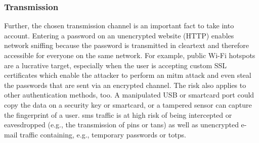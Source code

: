 \subsubsection{Transmission}

Further, the chosen transmission channel is an important fact to take into account. Entering a password on an unencrypted website (HTTP) enables network sniffing because the password is transmitted in cleartext and therefore accessible for everyone on the same network. For example, public Wi-Fi hotspots are a lucrative target, especially when the user is accepting custom SSL certificates which enable the attacker to perform an \gls{mitm} attack and even steal the passwords that are sent via an encrypted channel. The risk also applies to other authentication methods, too. A manipulated USB or smartcard port could copy the data on a security key or smartcard, or a tampered sensor can capture the fingerprint of a user. \gls{sms} traffic is at high risk of being intercepted or eavesdropped (e.g., the transmission of \glspl{pin} or \glspl{tan}) as well as unencrypted e-mail traffic containing, e.g., temporary passwords or \glspl{totp}.
